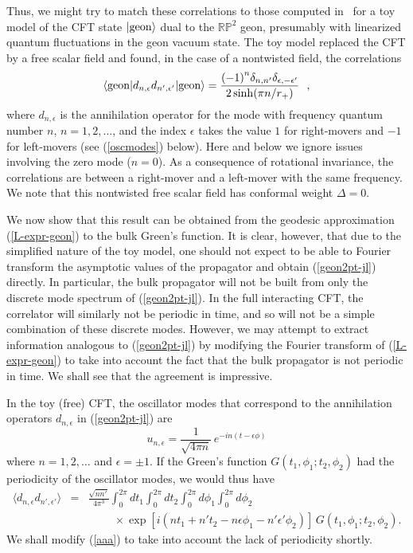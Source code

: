 \documentclass[a4paper,12pt]{article}
\begin{document}
Thus, we might try to match these correlations to those computed
in~\cite{louko:geon} for a toy model of the CFT state $|{\rm
  geon}\rangle$ dual to the ${\mathbb R}{\mathbb P}^2$ geon,
presumably with linearized quantum fluctuations in the geon vacuum
state.  The toy model replaced the CFT by a 
free scalar
field and found, in the case of a nontwisted field, the
correlations
%
\begin{equation} 
\label{geon2pt-jl}
\langle {\rm geon}| 
d_{n,\epsilon} d_{n',\epsilon'} 
|{\rm geon} \rangle =
\frac{
{(-1)}^n \delta_{n,n'} \delta_{\epsilon,-\epsilon'}}
 {2\sinh(\pi n/r_+)}
\ \ , 
\end{equation}
where $d_{n,\epsilon}$ is the annihilation operator for the
mode with frequency quantum number $n$, $n = 1,2,\dots$, and the
index $\epsilon$ takes the value $1$ for right-movers and $-1$ for
left-movers
(see (\ref{oscmodes}) below). 
Here and below we ignore issues involving the zero mode ($n=0$).
As a consequence of rotational invariance, the
correlations are between a right-mover and a left-mover with the same
frequency.  We note that this nontwisted free scalar field has
conformal weight $\Delta =0$.

We now show that this result can be obtained from the geodesic
approximation (\ref{L-expr-geon}) to the bulk Green's function.  It is
clear, however, that due to the simplified nature of the toy model,
one should not expect to be able to Fourier transform the asymptotic
values of the propagator and obtain (\ref{geon2pt-jl}) directly.  In
particular, the bulk propagator will not be built from only the
discrete mode spectrum of (\ref{geon2pt-jl}).  In the full interacting
CFT, the correlator will similarly not be periodic in time, and
so will not be a simple combination of these
discrete modes.  However, we may attempt to extract information
analogous to (\ref{geon2pt-jl}) by modifying the Fourier transform of
(\ref{L-expr-geon}) to take into account the fact that the bulk
propagator is not periodic in time.  We shall see that the agreement
is impressive.

In the toy (free) CFT, the oscillator modes that correspond to the
annihilation operators 
$d_{n,\epsilon}$
in (\ref{geon2pt-jl}) are
\cite{louko:geon}
\begin{equation}
u_{n,\epsilon} = \frac{1}{\sqrt{4\pi n}} 
\, e^{-in(t-\epsilon\phi)}
\label{oscmodes}
\end{equation}
where $n = 1,2,\dots$ and $\epsilon=\pm1$. 
If the Green's function 
$G(t_1,\phi_1; t_2,\phi_2)$ had
the periodicity of the oscillator modes, we would thus have 
%
\begin{eqnarray} 
\label{aaa}
\langle 
d_{n,\epsilon} d_{n',\epsilon'} 
\rangle 
&=&
\frac{\sqrt{n n'}}{4\pi^3} 
\int_{0}^{2\pi} dt_1 
\int_{0}^{2\pi} dt_2
\int_{0}^{2\pi} d\phi_1 
\int_{0}^{2\pi} d\phi_2 
\nonumber
\\
&&
\phantom{xxxx}
\times 
\exp[i(nt_1 + n't_2 - n\epsilon\phi_1 - n'\epsilon'\phi_2)]
\, 
G(t_1,\phi_1; t_2,\phi_2). 
\end{eqnarray}
% 
We shall modify 
(\ref{aaa}) to take into account the lack of periodicity shortly. 
\end{document}
